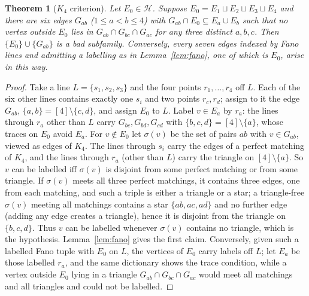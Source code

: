 \documentclass[11pt]{amsart}
\newtheorem{theorem}{Theorem}[section]
\theoremstyle{definition}
\theoremstyle{remark}
\newcommand{\cH}{\mathcal H}
\begin{document}
\begin{theorem}[$K_4$ criterion]\label{thm:K4}
Let $E_0\in\cH$. Suppose $E_0=E_1\sqcup E_2\sqcup E_3\sqcup E_4$ and there are six edges $G_{ab}$ ($1\le a<b\le4$) with $G_{ab}\cap E_0\subseteq E_a\cup E_b$ such that no vertex outside $E_0$ lies in $G_{ab}\cap G_{bc}\cap G_{ac}$ for any three distinct $a,b,c$. Then $\{E_0\}\cup\{G_{ab}\}$ is a bad subfamily. Conversely, every seven edges indexed by Fano lines and admitting a labelling as in Lemma~\ref{lem:fano}, one of which is $E_0$, arise in this way.
\end{theorem}
\begin{proof}
Take a line $L=\{s_1,s_2,s_3\}$ and the four points $r_1,\dots,r_4$ off $L$. Each of the six other lines contains exactly one $s_i$ and two points $r_c,r_d$; assign to it the edge $G_{ab}$, $\{a,b\}=[4]\setminus\{c,d\}$, and assign $E_0$ to $L$. Label $v\in E_a$ by $r_a$: the lines through $r_a$ other than $L$ carry $G_{bc},G_{bd},G_{cd}$ with $\{b,c,d\}=[4]\setminus\{a\}$, whose traces on $E_0$ avoid $E_a$. For $v\notin E_0$ let $\sigma(v)$ be the set of pairs $ab$ with $v\in G_{ab}$, viewed as edges of $K_4$. The lines through $s_i$ carry the edges of a perfect matching of $K_4$, and the lines through $r_a$ (other than $L$) carry the triangle on $[4]\setminus\{a\}$. So $v$ can be labelled iff $\sigma(v)$ is disjoint from some perfect matching or from some triangle. If $\sigma(v)$ meets all three perfect matchings, it contains three edges, one from each matching, and such a triple is either a triangle or a star; a triangle-free $\sigma(v)$ meeting all matchings contains a star $\{ab,ac,ad\}$ and no further edge (adding any edge creates a triangle), hence it is disjoint from the triangle on $\{b,c,d\}$. Thus $v$ can be labelled whenever $\sigma(v)$ contains no triangle, which is the hypothesis. Lemma~\ref{lem:fano} gives the first claim. Conversely, given such a labelled Fano tuple with $E_0$ on $L$, the vertices of $E_0$ carry labels off $L$; let $E_a$ be those labelled $r_a$, and the same dictionary shows the trace condition, while a vertex outside $E_0$ lying in a triangle $G_{ab}\cap G_{bc}\cap G_{ac}$ would meet all matchings and all triangles and could not be labelled.
\end{proof}
\end{document}
